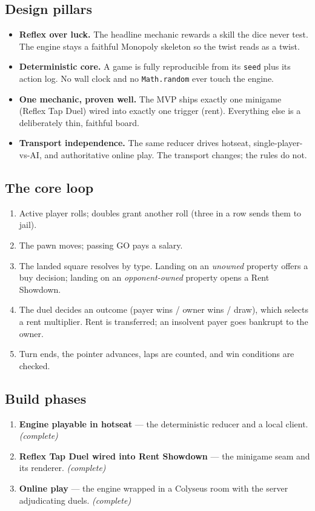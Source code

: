 \documentclass[11pt,a4paper]{article}
\newcommand{\code}[1]{\texttt{#1}}
\begin{document}
\subsection{Design pillars}
\begin{itemize}[leftmargin=1.4em]
  \item \textbf{Reflex over luck.} The headline mechanic rewards a skill the
        dice never test. The engine stays a faithful Monopoly skeleton so the
        twist reads as a twist.
  \item \textbf{Deterministic core.} A game is fully reproducible from its
        \code{seed} plus its action log. No wall clock and no \code{Math.random}
        ever touch the engine.
  \item \textbf{One mechanic, proven well.} The MVP ships exactly one minigame
        (Reflex Tap Duel) wired into exactly one trigger (rent). Everything
        else is a deliberately thin, faithful board.
  \item \textbf{Transport independence.} The same reducer drives hotseat,
        single-player-vs-AI, and authoritative online play. The transport
        changes; the rules do not.
\end{itemize}

\subsection{The core loop}
\begin{enumerate}[leftmargin=1.6em]
  \item Active player rolls; doubles grant another roll (three in a row sends
        them to jail).
  \item The pawn moves; passing GO pays a salary.
  \item The landed square resolves by type. Landing on an \emph{unowned}
        property offers a buy decision; landing on an \emph{opponent-owned}
        property opens a Rent Showdown.
  \item The duel decides an outcome (payer wins / owner wins / draw), which
        selects a rent multiplier. Rent is transferred; an insolvent payer goes
        bankrupt to the owner.
  \item Turn ends, the pointer advances, laps are counted, and win conditions
        are checked.
\end{enumerate}

\subsection{Build phases}
\begin{enumerate}[leftmargin=1.6em]
  \item \textbf{Engine playable in hotseat} --- the deterministic reducer and a
        local client. \emph{(complete)}
  \item \textbf{Reflex Tap Duel wired into Rent Showdown} --- the minigame seam
        and its renderer. \emph{(complete)}
  \item \textbf{Online play} --- the engine wrapped in a Colyseus room with the
        server adjudicating duels. \emph{(complete)}
\end{enumerate}
\end{document}
